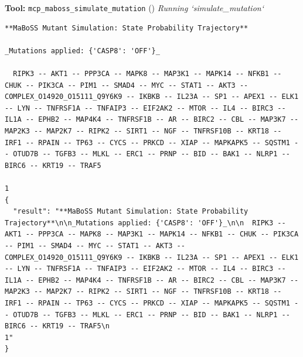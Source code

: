 \documentclass[11pt,a4paper]{article}
\begin{document}
\begin{toolokbox}
\textbf{Tool:} \texttt{mcp\_maboss\_simulate\_mutation} (\checkmark)
\textit{Running `simulate\_mutation`}
\begin{lstlisting}
**MaBoSS Mutant Simulation: State Probability Trajectory**

_Mutations applied: {'CASP8': 'OFF'}_

  RIPK3 -- AKT1 -- PPP3CA -- MAPK8 -- MAP3K1 -- MAPK14 -- NFKB1 -- CHUK -- PIK3CA -- PIM1 -- SMAD4 -- MYC -- STAT1 -- AKT3 -- COMPLEX_O14920_O15111_Q9Y6K9 -- IKBKB -- IL23A -- SP1 -- APEX1 -- ELK1 -- LYN -- TNFRSF1A -- TNFAIP3 -- EIF2AK2 -- MTOR -- IL4 -- BIRC3 -- IL1A -- EPHB2 -- MAP4K4 -- TNFRSF1B -- AR -- BIRC2 -- CBL -- MAP3K7 -- MAP2K3 -- MAP2K7 -- RIPK2 -- SIRT1 -- NGF -- TNFRSF10B -- KRT18 -- IRF1 -- RPAIN -- TP63 -- CYCS -- PRKCD -- XIAP -- MAPKAPK5 -- SQSTM1 -- OTUD7B -- TGFB3 -- MLKL -- ERC1 -- PRNP -- BID -- BAK1 -- NLRP1 -- BIRC6 -- KRT19 -- TRAF5
                                                                                                                                                                                                                                                                                                                                                                                                                                                                                                                                                                                    1
{
  "result": "**MaBoSS Mutant Simulation: State Probability Trajectory**\n\n_Mutations applied: {'CASP8': 'OFF'}_\n\n  RIPK3 -- AKT1 -- PPP3CA -- MAPK8 -- MAP3K1 -- MAPK14 -- NFKB1 -- CHUK -- PIK3CA -- PIM1 -- SMAD4 -- MYC -- STAT1 -- AKT3 -- COMPLEX_O14920_O15111_Q9Y6K9 -- IKBKB -- IL23A -- SP1 -- APEX1 -- ELK1 -- LYN -- TNFRSF1A -- TNFAIP3 -- EIF2AK2 -- MTOR -- IL4 -- BIRC3 -- IL1A -- EPHB2 -- MAP4K4 -- TNFRSF1B -- AR -- BIRC2 -- CBL -- MAP3K7 -- MAP2K3 -- MAP2K7 -- RIPK2 -- SIRT1 -- NGF -- TNFRSF10B -- KRT18 -- IRF1 -- RPAIN -- TP63 -- CYCS -- PRKCD -- XIAP -- MAPKAPK5 -- SQSTM1 -- OTUD7B -- TGFB3 -- MLKL -- ERC1 -- PRNP -- BID -- BAK1 -- NLRP1 -- BIRC6 -- KRT19 -- TRAF5\n                                                                                                                                                                                                                                                                                                                                                                                                                                                                                                                                                                                    1"
}
\end{lstlisting}
\end{toolokbox}
\end{document}
